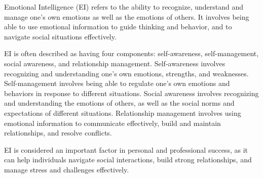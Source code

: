Emotional Intelligence (EI) refers to the ability to recognize, understand and manage one's own emotions as well as the emotions of others. It involves being able to use emotional information to guide thinking and behavior, and to navigate social situations effectively\cite{ISSN-2456-2165}.

EI is often described as having four components: self-awareness, self-management, social awareness, and relationship management. Self-awareness involves recognizing and understanding one's own emotions, strengths, and weaknesses. Self-management involves being able to regulate one's own emotions and behaviors in response to different situations. Social awareness involves recognizing and understanding the emotions of others, as well as the social norms and expectations of different situations. Relationship management involves using emotional information to communicate effectively, build and maintain relationships, and resolve conflicts.

EI is considered an important factor in personal and professional success, as it can help individuals navigate social interactions, build strong relationships, and manage stress and challenges effectively.